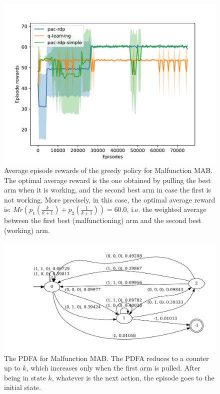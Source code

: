 \documentclass{article}
\begin{document}
\begin{figure}[!h]
 \centering
 \includegraphics[width=\linewidth]{plot-malfunctionmab.pdf}
 \caption{Average episode rewards of the greedy policy for Malfunction MAB.
 The optimal average reward is the one obtained by
 pulling the best arm when it is working, and the second best arm
 in case the first is not working.
 More precisely, in this case, the optimal average reward is:
 $Mr(p_1(\frac{k}{k+1}) + p_2(\frac{1}{k+1})) = 60.0$, i.e. the weighted
 average between the first best (malfunctioning) arm and the second best
 (working) arm.}
 \label{fig:malfunctionmab-experiment}
\end{figure}%
\begin{figure}[!h]
 \includegraphics[width=\linewidth]{pdfa-malfunctionmab-02-80-20.pdf}
 \caption{The PDFA for Malfunction MAB. The PDFA reduces
 to a counter up to $k$, which increases only when the first arm is pulled.
 After being in state $k$, whatever is the next action,
 the episode goes to the initial state.}
 \label{fig:malfunctionmab-pdfa}
\end{figure}
\end{document}
